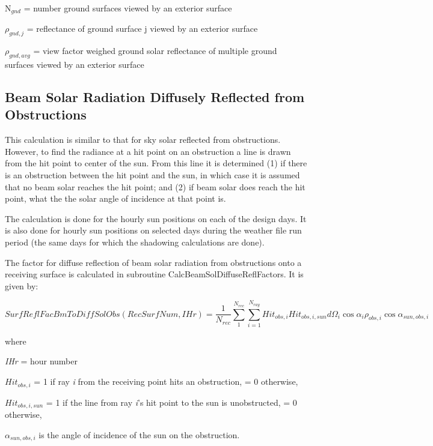 N\(_{gnd}\) = number ground surfaces viewed by an exterior surface

\({\rho_{gnd,j}}\) = reflectance of ground surface j viewed by an exterior surface

\({\rho_{gnd,avg}}\) = view factor weighed ground solar reflectance of multiple ground surfaces viewed by an exterior surface


\subsection{Beam Solar Radiation Diffusely Reflected from Obstructions}\label{beam-solar-radiation-diffusely-reflected-from-obstructions}

This calculation is similar to that for sky solar reflected from obstructions. However, to find the radiance at a hit point on an obstruction a line is drawn from the hit point to center of the sun. From this line it is determined (1) if there is an obstruction between the hit point and the sun, in which case it is assumed that no beam solar reaches the hit point; and (2) if beam solar does reach the hit point, what the the solar angle of incidence at that point is.

The calculation is done for the hourly sun positions on each of the design days. It is also done for hourly sun positions on selected days during the weather file run period (the same days for which the shadowing calculations are done).

The factor for diffuse reflection of beam solar radiation from obstructions onto a receiving surface is calculated in subroutine CalcBeamSolDiffuseReflFactors. It is given by:

{\scriptsize
\begin{equation}
{SurfReflFacBmToDiffSolObs(RecSurfNum,IHr)} = \frac{1}{{{N_{rec}}}}\sum\limits_1^{{N_{rec}}} {\sum\limits_{i = 1}^{{N_{ray}}} {Hi{t_{obs,i}}Hi{t_{obs,i,sun}}d{\Omega_i}\cos {\alpha_i}{\rho_{obs,i}}\cos {\alpha_{sun,obs,i}}} }
\end{equation}}

where

\emph{IHr} = hour number

\(Hi{t_{obs,i}}\) = 1 if ray \emph{i} from the receiving point hits an obstruction, = 0 otherwise,

\(Hi{t_{obs,i,sun}}\) = 1 if the line from ray \emph{i}'s hit point to the sun is unobstructed, = 0 otherwise,

\({\alpha_{sun,obs,i}}\) is the angle of incidence of the sun on the obstruction.


